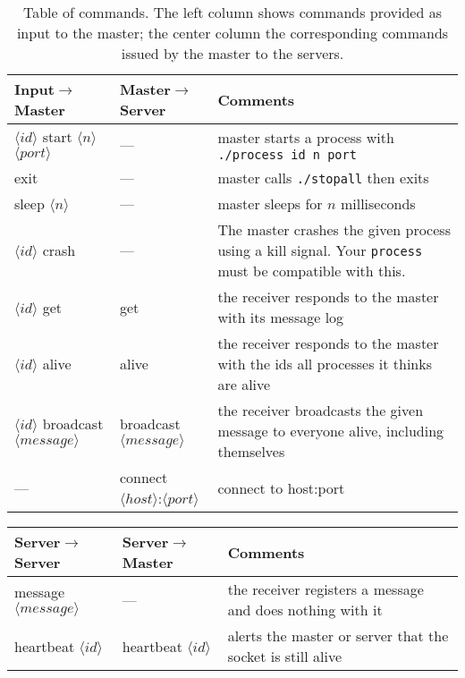 \documentclass[12pt]{article}
\begin{document}
\begin{table}[!h]
	\centering
	\begin{tabular}{|p{5cm}|p{3.5cm}|p{6.5cm}|}
		\hline
		Input$\to$Master & Master$\to$Server & Comments \\
		\hline
		\hline
		$\langle id\rangle$ start $\langle n\rangle$ $\langle port\rangle$& --- &
		master starts a process with \texttt{./process id n port} \\
		\hline
		exit & --- & master calls \texttt{./stopall} then exits\\
		\hline
		sleep $\langle n \rangle$ & --- & master sleeps for $n$ milliseconds\\
		\hline
		$\langle id\rangle$ crash & --- & The master crashes the given process using a kill signal. Your \texttt{process} must be compatible with this.\\
		\hline
		\hline
		$\langle id\rangle$ get & get & the receiver responds to the master with its message log\\
		\hline
		$\langle id\rangle$ alive & alive & the receiver responds to the master with the ids all processes it thinks are alive\\
		\hline
		$\langle id\rangle$ broadcast $\langle message\rangle$ & broadcast $\langle message\rangle$ & the receiver broadcasts the given message to everyone alive, including themselves\\
		\hline
		--- & connect $\langle host \rangle$:$\langle port \rangle$ & connect to host:port \\
		\hline
	\end{tabular}
	\caption{Table of commands.
		The left column shows commands provided as input to the master;
		the center column the corresponding commands issued by the master to the servers.}
	\label{tab:commands}
\end{table}
\begin{table}[!h]
	\centering
	\begin{tabular}{|p{5cm}|p{5cm}|p{5cm}|}
		\hline
		Server$\to$Server  & Server$\to$Master& Comments \\
		\hline
		message $\langle message \rangle$ & --- & the receiver registers a message and does nothing with it \\
		\hline
		heartbeat $\langle id \rangle$ & heartbeat $\langle id \rangle$ & alerts the master or server that the socket is still alive \\
		\hline
	\end{tabular}
\end{table}
\end{document}
